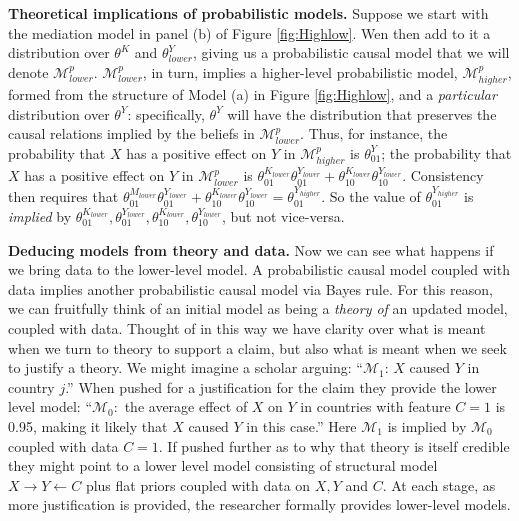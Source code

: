 \documentclass[
  12pt,
]{book}
\begin{document}
\textbf{Theoretical implications of probabilistic models.} Suppose we start with the mediation model in panel (b) of Figure \ref{fig:Highlow}. Wen then add to it a distribution over \(\theta^K\) and \(\theta^Y_{lower}\), giving us a probabilistic causal model that we will denote \(\mathcal M^p_{lower}\). \(\mathcal M^p_{lower}\), in turn, implies a higher-level probabilistic model, \(\mathcal M^p_{higher}\), formed from the structure of Model (a) in Figure \ref{fig:Highlow}, and a \emph{particular} distribution over \(\theta^Y\): specifically, \(\theta^Y\) will have the distribution that preserves the causal relations implied by the beliefs in \(\mathcal M^p_{lower}\). Thus, for instance, the probability that \(X\) has a positive effect on \(Y\) in \(\mathcal M^p_{higher}\) is \(\theta^{Y}_{01}\); the probability that \(X\) has a positive effect on \(Y\) in \(\mathcal M^p_{lower}\) is \(\theta^{K_{lower}}_{01}\theta^{Y_{lower}}_{01} + \theta^{K_{lower}}_{10}\theta^{Y_{lower}}_{10}\). Consistency then requires that \(\theta^{M_{lower}}_{01}\theta^{Y_{lower}}_{01} + \theta^{K_{lower}}_{10}\theta^{Y_{lower}}_{10} = \theta^{Y_{higher}}_{01}\). So the value of \(\theta^{Y_{higher}}_{01}\) is \emph{implied} by \(\theta^{K_{lower}}_{01},\theta^{Y_{lower}}_{01}, \theta^{K_{lower}}_{10},\theta^{Y_{lower}}_{10}\), but not vice-versa.

\textbf{Deducing models from theory and data.} Now we can see what happens if we bring data to the lower-level model. A probabilistic causal model coupled with data implies another probabilistic causal model via Bayes rule. For this reason, we can fruitfully think of an initial model as being a \emph{theory of} an updated model, coupled with data. Thought of in this way we have clarity over what is meant when we turn to theory to support a claim, but also what is meant when we seek to justify a theory. We might imagine a scholar arguing: ``\(\mathcal M_1\): \(X\) caused \(Y\) in country \(j\).'' When pushed for a justification for the claim they provide the lower level model: ``\(\mathcal M_0:\) the average effect of \(X\) on \(Y\) in countries with feature \(C=1\) is 0.95, making it likely that \(X\) caused \(Y\) in this case.'' Here \(\mathcal M_1\) is implied by \(\mathcal M_0\) coupled with data \(C=1\). If pushed further as to why that theory is itself credible they might point to a lower level model consisting of structural model \(X\rightarrow Y \leftarrow C\) plus flat priors coupled with data on \(X,Y\) and \(C\). At each stage, as more justification is provided, the researcher formally provides lower-level models.
\end{document}
